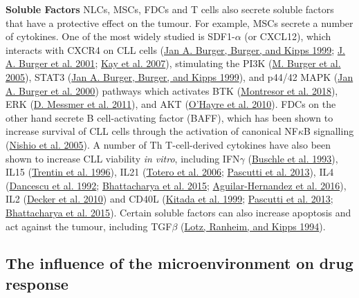 \documentclass[11pt, a4paper, twosided]{book}
\begin{document}
\textbf{Soluble Factors}
NLCs, MSCs, FDCs and T cells also secrete soluble factors that have a protective effect on the tumour. For example, MSCs secrete a number of cytokines. One of the most widely studied is SDF1-\(\alpha\) (or CXCL12), which interacts with CXCR4 on CLL cells (\protect\hyperlink{ref-Burger1999}{Jan A. Burger, Burger, and Kipps 1999}; \protect\hyperlink{ref-Burger2001}{J. A. Burger et al. 2001}; \protect\hyperlink{ref-Kay2007}{Kay et al. 2007}), stimulating the PI3K (\protect\hyperlink{ref-Burger2005}{M. Burger et al. 2005}), STAT3 (\protect\hyperlink{ref-Burger1999}{Jan A. Burger, Burger, and Kipps 1999}), and p44/42 MAPK (\protect\hyperlink{ref-Burger2000}{Jan A. Burger et al. 2000}) pathways which activates BTK (\protect\hyperlink{ref-Montresor2018}{Montresor et al. 2018}), ERK (\protect\hyperlink{ref-Messmer2011}{D. Messmer et al. 2011}), and AKT (\protect\hyperlink{ref-OHayre2010}{O'Hayre et al. 2010}). FDCs on the other hand secrete B cell-activating factor (BAFF), which has been shown to increase survival of CLL cells through the activation of canonical NF\(\kappa\)B signalling (\protect\hyperlink{ref-Nishio2005}{Nishio et al. 2005}). A number of Th T-cell-derived cytokines have also been shown to increase CLL viability \emph{in vitro}, including IFN\(\gamma\) (\protect\hyperlink{ref-Buschle1993}{Buschle et al. 1993}), IL15 (\protect\hyperlink{ref-Trentin1996}{Trentin et al. 1996}), IL21 (\protect\hyperlink{ref-deTotero2006}{Totero et al. 2006}; \protect\hyperlink{ref-Pascutti2013}{Pascutti et al. 2013}), IL4 (\protect\hyperlink{ref-Dancescu1992}{Dancescu et al. 1992}; \protect\hyperlink{ref-Bhattacharya2015}{Bhattacharya et al. 2015}; \protect\hyperlink{ref-AguilarHernandez2016}{Aguilar-Hernandez et al. 2016}), IL2 (\protect\hyperlink{ref-Decker2010}{Decker et al. 2010}) and CD40L (\protect\hyperlink{ref-Kitada1999}{Kitada et al. 1999}; \protect\hyperlink{ref-Pascutti2013}{Pascutti et al. 2013}; \protect\hyperlink{ref-Bhattacharya2015}{Bhattacharya et al. 2015}). Certain soluble factors can also increase apoptosis and act against the tumour, including TGF\(\beta\) (\protect\hyperlink{ref-Lotz1994}{Lotz, Ranheim, and Kipps 1994}).

\hypertarget{intro-microenvironment-drug-response}{%
\subsection{The influence of the microenvironment on drug response}\label{intro-microenvironment-drug-response}}
\end{document}
